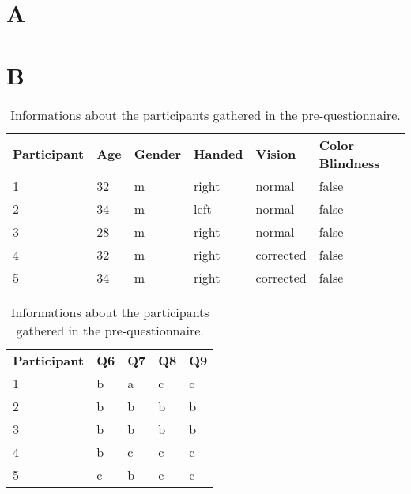 \chapter{\label{appendix::A}A}



\chapter{\label{appendix::B}B}
\begin{table}[h]
    \centering
    \begin{tabular}{llllll}
    \textbf{Participant} & \textbf{Age} & \textbf{Gender} & \textbf{Handed} & \textbf{Vision} & \textbf{Color Blindness} \\
    1             & 32           & m               & right           & normal          & false                     \\
    2             & 34           & m               & left            & normal          & false                     \\
    3             & 28           & m               & right           & normal          & false                     \\
    4             & 32           & m               & right           & corrected       & false                     \\
    5             & 34           & m               & right           & corrected       & false   
    \end{tabular}
    \begin{tabular}{lllll}
    \textbf{Participant} & \textbf{Q6} & \textbf{Q7} & \textbf{Q8} & \textbf{Q9} \\
        1             & b           & a           & c           & c           \\
        2             & b           & b           & b           & b           \\
        3             & b           & b           & b           & b           \\
        4             & b           & c           & c           & c           \\
        5             & c           & b           & c           & c          
    \end{tabular}
    \caption{Informations about the participants gathered in the pre-questionnaire.}
\end{table}